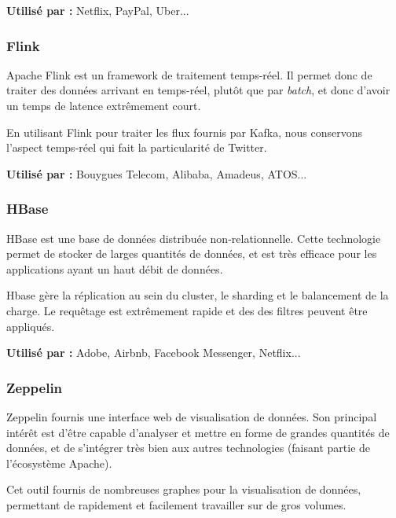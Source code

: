 \documentclass[a4paper,oneside,10pt]{article}
\begin{document}
\textbf{Utilisé par :} Netflix, PayPal, Uber...



\subsubsection{Flink}
Apache Flink est un framework de traitement temps-réel. Il permet donc de traiter des données arrivant en temps-réel, plutôt que par \textit{batch}, et donc d'avoir un temps de latence extr\^emement court.

En utilisant Flink pour traiter les flux fournis par Kafka, nous conservons l'aspect temps-réel qui fait la particularité de Twitter.

\textbf{Utilisé par :} Bouygues Telecom, Alibaba, Amadeus, ATOS...


\subsubsection{HBase}
HBase est une base de données distribuée non-relationnelle. Cette technologie permet de stocker de larges quantités de données, et est très efficace pour les applications ayant un haut débit de données.

Hbase gère la réplication au sein du cluster, le sharding et le balancement de la charge. Le requêtage est extrêmement rapide et des des filtres peuvent être appliqués.

\textbf{Utilisé par :} Adobe, Airbnb, Facebook Messenger, Netflix...


\subsubsection{Zeppelin}
Zeppelin fournis une interface web de visualisation de données. Son principal intérêt est d'être capable d'analyser et mettre en forme de grandes quantités de données, et de s'intégrer très bien aux autres technologies (faisant partie de l'écosystème Apache).

Cet outil fournis de nombreuses graphes pour la visualisation de données, permettant de rapidement et facilement travailler sur de gros volumes.
\end{document}
